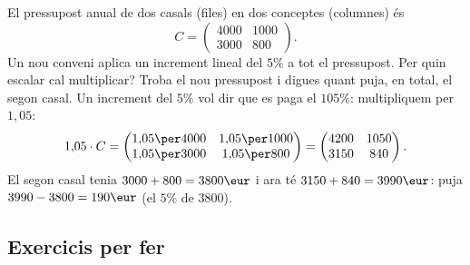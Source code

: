 \begin{exresolt}
El pressupost anual de dos casals (files) en dos conceptes (columnes) és
\[
C=\begin{pmatrix} 4000 & 1000 \\ 3000 & 800 \end{pmatrix}.
\]
Un nou conveni aplica un increment lineal del $5\%$ a tot el pressupost. Per quin
escalar cal multiplicar? Troba el nou pressupost i digues quant puja, en total, el
segon casal.
\solucio
Un increment del $5\%$ vol dir que es paga el $105\%$: multipliquem per $1{,}05$:
\[
1{,}05\cdot C=\begin{pmatrix} 1{,}05\per 4000 & 1{,}05\per 1000 \\ 1{,}05\per 3000 & 1{,}05\per 800 \end{pmatrix}
            =\begin{pmatrix} 4200 & 1050 \\ 3150 & 840 \end{pmatrix}.
\]
El segon casal tenia $3000+800=3800\eur$ i ara té $3150+840=3990\eur$: puja
$3990-3800=190\eur$ (el $5\%$ de $3800$).
\end{exresolt}

\subsection{Exercicis per fer}

